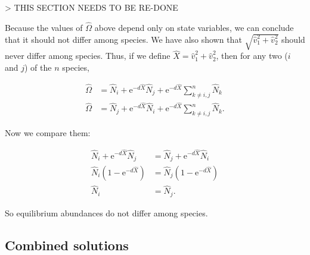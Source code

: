 > THIS SECTION NEEDS TO BE RE-DONE

Because the values of $\hat{\Omega}$ above depend only on state variables,
we can conclude that it should not differ among species.
We have also shown that $\sqrt{\hat{v}_1^2 + \hat{v}_2^2}$ should never
differ among species.
Thus, if we define $\hat{X} = \hat{v}_1^2 + \hat{v}_2^2$,
then for any two ($i$ and $j$) of the $n$ species,

\begin{equation*}
\begin{split}
    \hat{\Omega} &= \hat{N}_i + \textrm{e}^{-d \hat{X}} \hat{N}_j +
        \textrm{e}^{-d \hat{X}} \sum_{k \ne i,j}^{n}{ \hat{N}_k } \\
    \hat{\Omega} &= \hat{N}_j + \textrm{e}^{-d \hat{X}} \hat{N}_i +
        \textrm{e}^{-d \hat{X}} \sum_{k \ne i,j}^{n}{ \hat{N}_k }
    \textrm{.}
\end{split}
\end{equation*}


Now we compare them:

\begin{equation*}
\begin{split}
    \hat{N}_i + \textrm{e}^{-d \hat{X}} \hat{N}_j &=
        \hat{N}_j + \textrm{e}^{-d \hat{X}} \hat{N}_i \\
    \hat{N}_i \left( 1 - \textrm{e}^{-d \hat{X}} \right) &=
        \hat{N}_j \left( 1 - \textrm{e}^{-d \hat{X}} \right) \\
    \hat{N}_i &= \hat{N}_j
    \textrm{.}
\end{split}
\end{equation*}

\noindent So equilibrium abundances do not differ among species.



















\subsection*{Combined solutions}


